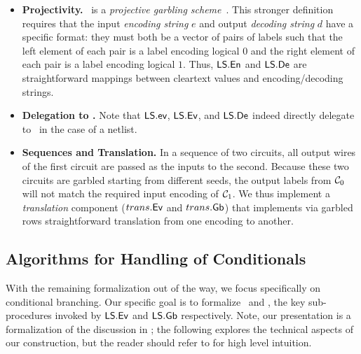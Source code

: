 \begin{itemize}
  \item \textbf{Projectivity.} \ourschemelong\
    is a \emph{projective garbling scheme}~\cite{CCS:BelHoaRog12}.
    This stronger definition requires that the input \emph{encoding string}
    $e$ and output \emph{decoding string} $d$ have a specific format:
    they must both be a vector of pairs of labels such that the left
    element of each pair is a label encoding logical $0$ and the right
    element of each pair is a label encoding logical $1$.
    Thus, $\textsf{LS}.\textsf{En}$ and $\textsf{LS}.\textsf{De}$ are straightforward
    mappings between cleartext values and encoding/decoding strings.
  \item \textbf{Delegation to \underscheme.} Note that
    $\textsf{LS}.\textsf{ev}$, $\textsf{LS}.\textsf{Ev}$, and $\textsf{LS}.\textsf{De}$ indeed
    directly delegate to \underscheme\ in the case of a netlist.
  \item \textbf{Sequences and Translation.} In a sequence of two
    circuits, all output wires of the first circuit are passed as the inputs
    to the second. Because these two circuits are garbled starting
    from different seeds, the output labels from $\mathcal C_0$ will not match the required
    input encoding of $\mathcal C_1$.
    We thus implement a \emph{translation} component ($trans.\textsf{Ev}$
    and $trans.\textsf{Gb}$) that implements via garbled rows
    straightforward translation from one encoding to another.
\end{itemize}

\subsection{Algorithms for Handling of Conditionals}\label{sec:approach-cond}

With the remaining formalization out of the way, we focus specifically
on conditional branching. Our specific goal is to formalize \evcond\
and \gbcond, the key sub-procedures invoked by $\textsf{LS}.\textsf{Ev}$ and
$\textsf{LS}.\textsf{Gb}$ respectively.
Note, our presentation is a formalization of the discussion in
; the following explores the technical aspects
of our construction, but the reader should refer to
\Cref{sec:techOverview} for high level intuition.


